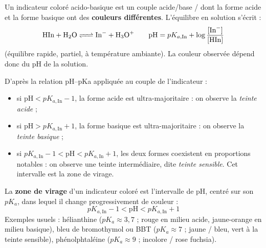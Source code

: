 \documentclass[11pt]{article}
\newcommand{\cle}[1]{{\popxbold\color{popdark}#1}}
\begin{document}
\begin{definition}
Un \cle{indicateur coloré} acido-basique est un couple acide/base / dont la forme acide  et la forme basique  ont des \textbf{couleurs différentes}. L'équilibre en solution s'écrit :
\[ \ce{HIn + H2O <=> In- + H3O+} \qquad \mathrm{pH} = pK_{a,\mathrm{In}} + \log\frac{[\ce{In-}]}{[\ce{HIn}]} \]
(équilibre rapide, partiel, à température ambiante). La couleur observée dépend donc du pH de la solution.
\end{definition}

D'après la relation pH--pKa appliquée au couple de l'indicateur :
\begin{itemize}
\item si $\mathrm{pH} < pK_{a,\mathrm{In}} - 1$, la forme acide  est ultra-majoritaire : on observe la \emph{teinte acide} ;
\item si $\mathrm{pH} > pK_{a,\mathrm{In}} + 1$, la forme basique  est ultra-majoritaire : on observe la \emph{teinte basique} ;
\item si $pK_{a,\mathrm{In}} - 1 < \mathrm{pH} < pK_{a,\mathrm{In}} + 1$, les deux formes coexistent en proportions notables : on observe une teinte intermédiaire, dite \emph{teinte sensible}. Cet intervalle est la \cle{zone de virage}.
\end{itemize}

\begin{aretenir}
La \textbf{zone de virage} d'un indicateur coloré est l'intervalle de pH, centré sur son $pK_a$, dans lequel il change progressivement de couleur :
\[ pK_{a,\mathrm{In}} - 1 < \mathrm{pH} < pK_{a,\mathrm{In}} + 1 \]
Exemples usuels : hélianthine ($pK_a \approx 3,7$ ; rouge en milieu acide, jaune-orange en milieu basique), bleu de bromothymol ou BBT ($pK_a \approx 7$ ; jaune / bleu, vert à la teinte sensible), phénolphtaléine ($pK_a \approx 9$ ; incolore / rose fuchsia).
\end{aretenir}
\end{document}
